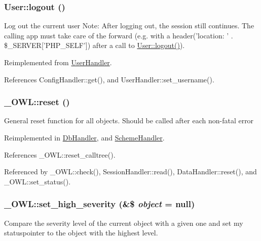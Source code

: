\subsubsection[{logout}]{\setlength{\rightskip}{0pt plus 5cm}User::logout ()}\label{classUser_a06ed977c877b02b420233d4f18a6a668}
Log out the current user Note: After logging out, the session still continues. The calling app must take care of the forward (e.g. with a header('location: ' . \$\_\-SERVER\mbox{[}'PHP\_\-SELF'\mbox{]}) after a call to \hyperlink{classUser_a06ed977c877b02b420233d4f18a6a668}{User::logout()}). 

Reimplemented from \hyperlink{classUserHandler_a8000feaceda9d3c37fc56b6d1969b8f7}{UserHandler}.



References ConfigHandler::get(), and UserHandler::set\_\-username().

\subsubsection[{reset}]{\setlength{\rightskip}{0pt plus 5cm}\_\-OWL::reset ()}\label{class__OWL_a2f2a042bcf31965194c03033df0edc9b}
General reset function for all objects. Should be called after each non-\/fatal error 

Reimplemented in \hyperlink{classDbHandler_a9982df4830f05803935bb31bac7fae3d}{DbHandler}, and \hyperlink{classSchemeHandler_aa25feb4a70d67b3d571904be4b2f50bc}{SchemeHandler}.



References \_\-OWL::reset\_\-calltree().



Referenced by \_\-OWL::check(), SessionHandler::read(), DataHandler::reset(), and \_\-OWL::set\_\-status().

\subsubsection[{set\_\-high\_\-severity}]{\setlength{\rightskip}{0pt plus 5cm}\_\-OWL::set\_\-high\_\-severity (\&\$ {\em object} = {\ttfamily null})}\label{class__OWL_a576829692a3b66e3d518853bf43abae3}
Compare the severity level of the current object with a given one and set my statuspointer to the object with the highest level. 


